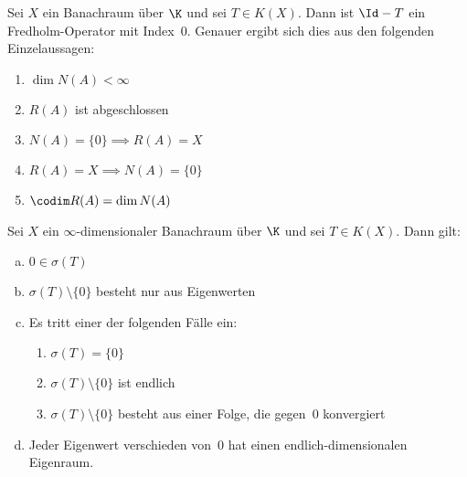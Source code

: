 \begin{thSatz}
    Sei $X$ ein Banachraum über $\K$ und sei $T\in K(X)$.
    Dann ist $\Id-T$ ein Fredholm-Operator mit Index~$0$.
    Genauer ergibt sich dies aus den folgenden Einzelaussagen:
    \begin{enumerate}[(1),leftmargin=1.8cm,labelsep=1.5em]
        \item
            $\dim N(A) < \infty$
        \item
            $R(A)$ ist abgeschlossen
        \item
            $N(A)=\{0\} \implies R(A) = X$
        \item
            $R(A) = X \implies N(A) = \{0\}$
        \item
            $\codim R(A) = \dim N(A)$
    \end{enumerate}
\end{thSatz}


\begin{thSatz}
    Sei $X$ ein $\infty$-dimensionaler Banachraum über $\K$ und sei $T\in K(X)$.
    Dann gilt:
    \begin{enumerate}[(a)]
        \item
            $0\in \sigma(T)$
        \item
            $\sigma(T)\setminus\{0\}$ besteht nur aus Eigenwerten
        \item
            Es tritt einer der folgenden Fälle ein:
            \begin{enumerate}[(1),leftmargin=*,labelsep=1em]
                \item
                    $\sigma(T) = \{0\}$
                \item
                    $\sigma(T) \setminus \{0\}$ ist endlich
                \item
                    $\sigma(T) \setminus \{0\}$ besteht aus einer Folge,
                    die gegen~$0$ konvergiert
            \end{enumerate}
        \item
            Jeder Eigenwert verschieden von~$0$ hat einen endlich-dimensionalen Eigenraum.
    \end{enumerate}
\end{thSatz}
